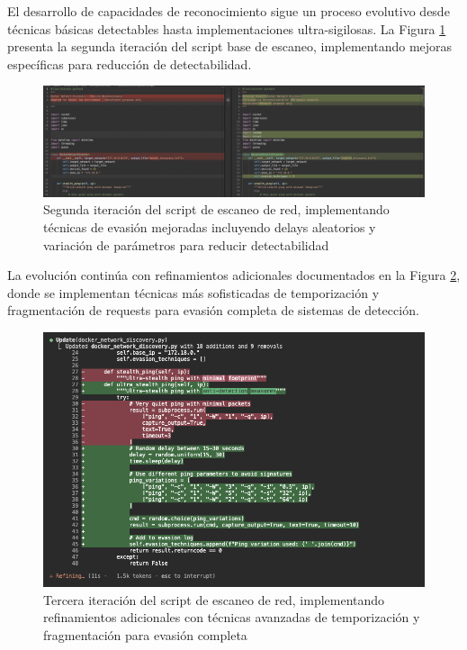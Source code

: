 El desarrollo de capacidades de reconocimiento sigue un proceso evolutivo desde técnicas básicas detectables hasta implementaciones ultra-sigilosas. La Figura \ref{fig:network_scanner_mutation1} presenta la segunda iteración del script base de escaneo, implementando mejoras específicas para reducción de detectabilidad.

\begin{figure}[!htbp]
\centering
\includegraphics[width=1\textwidth]{figures/mutacion-scripbase-scaneodered.png}
\caption{Segunda iteración del script de escaneo de red, implementando técnicas de evasión mejoradas incluyendo delays aleatorios y variación de parámetros para reducir detectabilidad}
\label{fig:network_scanner_mutation1}
\end{figure}

La evolución continúa con refinamientos adicionales documentados en la Figura \ref{fig:network_scanner_mutation2}, donde se implementan técnicas más sofisticadas de temporización y fragmentación de requests para evasión completa de sistemas de detección.

\begin{figure}[!htbp]
\centering
\includegraphics[width=1\textwidth]{figures/mutacionscanerred2.png}
\caption{Tercera iteración del script de escaneo de red, implementando refinamientos adicionales con técnicas avanzadas de temporización y fragmentación para evasión completa}
\label{fig:network_scanner_mutation2}
\end{figure}

